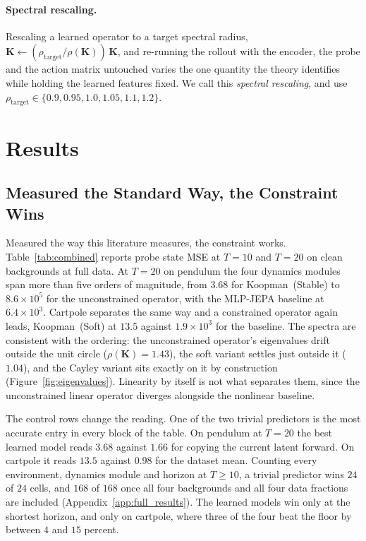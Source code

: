 \documentclass[10pt]{article} %
\newcommand{\K}{\mathbf{K}}
\begin{document}
\paragraph{Spectral rescaling.}
Rescaling a learned operator to a target spectral radius, $\K \leftarrow (\rho_\text{target} / \rho(\K))\,\K$, and re-running the rollout with the encoder, the probe and the action matrix untouched varies the one quantity the theory identifies while holding the learned features fixed. We call this \emph{spectral rescaling}, and use $\rho_\text{target} \in \{0.9, 0.95, 1.0, 1.05, 1.1, 1.2\}$.

\section{Results}
\label{sec:exp}

\subsection{Measured the Standard Way, the Constraint Wins}
\label{sec:results}

Measured the way this literature measures, the constraint works. Table~\ref{tab:combined} reports probe state MSE at $T{=}10$ and $T{=}20$ on clean backgrounds at full data. At $T{=}20$ on pendulum the four dynamics modules span more than five orders of magnitude, from $3.68$ for Koopman~(Stable) to $8.6\times10^{5}$ for the unconstrained operator, with the MLP-JEPA baseline at $6.4\times10^{3}$. Cartpole separates the same way and a constrained operator again leads, Koopman~(Soft) at $13.5$ against $1.9\times10^{3}$ for the baseline. The spectra are consistent with the ordering: the unconstrained operator's eigenvalues drift outside the unit circle ($\rho(\K) = 1.43$), the soft variant settles just outside it ($1.04$), and the Cayley variant sits exactly on it by construction (Figure~\ref{fig:eigenvalues}). Linearity by itself is not what separates them, since the unconstrained linear operator diverges alongside the nonlinear baseline.

The control rows change the reading. One of the two trivial predictors is the most accurate entry in every block of the table. On pendulum at $T{=}20$ the best learned model reads $3.68$ against $1.66$ for copying the current latent forward. On cartpole it reads $13.5$ against $0.98$ for the dataset mean. Counting every environment, dynamics module and horizon at $T \ge 10$, a trivial predictor wins $24$ of $24$ cells, and $168$ of $168$ once all four backgrounds and all four data fractions are included (Appendix~\ref{app:full_results}). The learned models win only at the shortest horizon, and only on cartpole, where three of the four beat the floor by between $4$ and $15$ percent.
\end{document}

